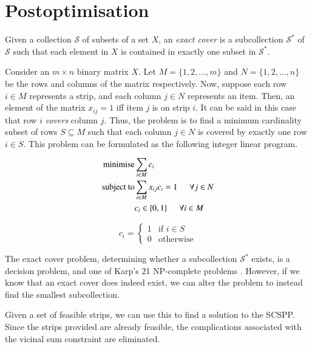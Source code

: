 \documentclass{elsarticle}
\begin{document}

\section{Postoptimisation}
\label{sec:postopt}
Given a collection $\mathcal{S}$ of subsets of a set $X$, an \emph{exact cover} is a subcollection $\mathcal{S}^*$ of $\mathcal{S}$ such that each element in $X$ is contained in exactly one subset in $\mathcal{S}^*$.

Consider an $m\times n$ binary matrix $X$. Let $M = \{1,2,\dotsc,m\}$ and $N = \{1,2,\dotsc,n\}$ be the rows and columns of the matrix respectively. Now, suppose each row $i \in M$ represents a strip, and each column $j \in N$ represents an item. Then, an element of the matrix $x_{ij} = 1$ iff item $j$ is on strip $i$. It can be said in this case that row $i$ \emph{covers} column $j$. Thus, the problem is to find a minimum cardinality subset of rows $S \subseteq M$ such that each column $j \in N$ is covered by exactly one row $i \in S$. This problem can be formulated as the following integer linear program.

\begin{align*}
\text{minimise} &\sum_{i \in M} c_i \\
\text{subject to} &\sum_{i \in M} x_{ij} c_i = 1 \hspace{5mm} \forall j \in N \\
&c_i \in \{0,1\} \hspace{5mm} \forall i \in M
\end{align*}

\[c_i =
\begin{cases} 
1 & \text{if } i \in S \\
0 & \text{otherwise} 
\end{cases}
\]


The exact cover problem, determining whether a subcollection $\mathcal{S}^*$ exists, is a decision problem, and one of Karp's 21 NP-complete problems \cite{karp1972}. However, if we know that an exact cover does indeed exist, we can alter the problem to instead find the smallest subcollection.

Given a set of feasible strips, we can use this to find a solution to the SCSPP. Since the strips provided are already feasible, the complications associated with the vicinal sum constraint are eliminated.
\end{document}
